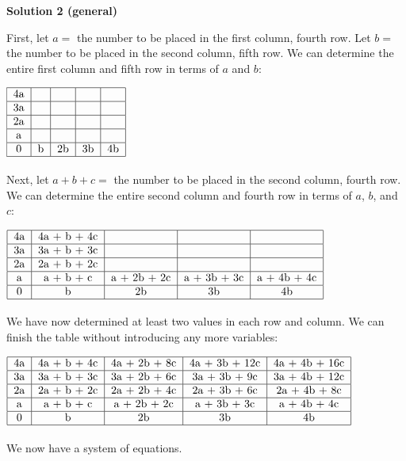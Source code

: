 \begin{enumerate}
 



\textbf{Solution 2 (general)}

First, let $a =$ the number to be placed in the first column, fourth row.  Let $b =$ the number to be placed in the second column, fifth row.  We can determine the entire first column and fifth row in terms of $a$ and $b$:

 $\begin{tabular}[b]{|c|c|c|c|c|}\hline 4a & & & & \\ \hline 3a & & & & \\ \hline 2a & & & & \\ \hline a & & & & \\ \hline 0 & b & 2b & 3b & 4b \\ \hline \end{tabular}$

 Next, let $a + b + c =$ the number to be placed in the second column, fourth row.  We can determine the entire second column and fourth row in terms of $a$, $b$, and $c$:

 $\begin{tabular}[b]{|c|c|c|c|c|}\hline 4a & 4a + b + 4c & & & \\ \hline 3a & 3a + b + 3c & & & \\ \hline 2a & 2a + b + 2c & & & \\ \hline a & a + b + c & a + 2b + 2c & a + 3b + 3c & a + 4b + 4c \\ \hline 0 & b & 2b & 3b & 4b \\ \hline \end{tabular}$

 We have now determined at least two values in each row and column.  We can finish the table without introducing any more variables:

 $\begin{tabular}[b]{|c|c|c|c|c|}\hline 4a & 4a + b + 4c & 4a + 2b + 8c & 4a + 3b + 12c & 4a + 4b + 16c \\ \hline 3a & 3a + b + 3c & 3a + 2b + 6c & 3a + 3b + 9c & 3a + 4b + 12c \\ \hline 2a & 2a + b + 2c & 2a + 2b + 4c & 2a + 3b + 6c & 2a + 4b + 8c \\ \hline a & a + b + c & a + 2b + 2c & a + 3b + 3c & a + 4b + 4c \\ \hline 0 & b & 2b & 3b & 4b \\ \hline \end{tabular}$

 We now have a system of equations.


\end{enumerate}
